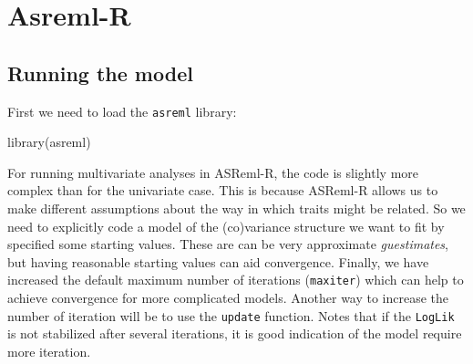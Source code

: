 \documentclass[
  12pt,
]{book}
\newenvironment{Shaded}{\begin{snugshade}}{\end{snugshade}}
\newcommand{\FunctionTok}[1]{\textcolor[rgb]{0.00,0.00,0.00}{#1}}
\newcommand{\NormalTok}[1]{#1}
\newcommand{\OtherTok}[1]{\textcolor[rgb]{0.56,0.35,0.01}{#1}}
\newcommand{\SpecialCharTok}[1]{\textcolor[rgb]{0.00,0.00,0.00}{#1}}
\newcommand{\StringTok}[1]{\textcolor[rgb]{0.31,0.60,0.02}{#1}}
\begin{document}
\begin{Shaded}
\end{Shaded}

\hypertarget{asreml-biv}{%
\section{Asreml-R}\label{asreml-biv}}

\hypertarget{running-the-model-3}{%
\subsection{Running the model}\label{running-the-model-3}}

First we need to load the \texttt{asreml} library:

\begin{Shaded}
\begin{Highlighting}[]
\FunctionTok{library}\NormalTok{(asreml)}
\end{Highlighting}
\end{Shaded}

For running multivariate analyses in ASReml-R, the code is slightly more complex than for the univariate case. This is because ASReml-R allows us to make different assumptions about the way in which traits might be related. So we need to explicitly code a model of the (co)variance structure we want to fit by specified some starting values. These are can be very approximate \emph{guestimates}, but having reasonable starting values can aid convergence. Finally, we have increased the default maximum number of iterations (\texttt{maxiter}) which can help to achieve convergence for more complicated models. Another way to increase the number of iteration will be to use the \texttt{update} function. Notes that if the \texttt{LogLik} is not stabilized after several iterations, it is good indication of the model require more iteration.
\end{document}
